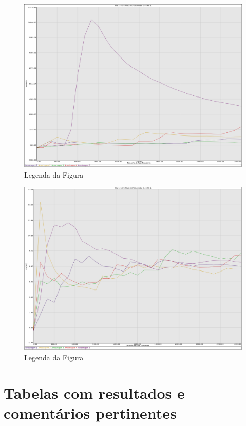 \documentclass[a4paper,10pt]{article}
\begin{document}
\begin{figure}
	\caption{Legenda da Figura}
	\label{figTransiente3kfila2VarW}
	\includegraphics[scale = 0.2]{./graficos_transiente_2/03.png}
\end{figure}

\begin{figure}
	\caption{Legenda da Figura}
	\label{figTransiente3kfila1VarW}
	\includegraphics[scale = 0.2]{./graficos_transiente_2/04.png}
\end{figure}

\clearpage
\pagebreak

\section{Tabelas com resultados e comentários pertinentes}
\pagebreak
\end{document}
